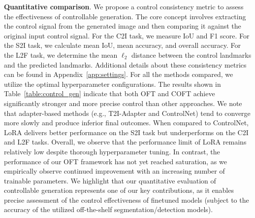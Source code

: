 \textbf{Quantitative comparison}. We propose a control consistency metric to assess the effectiveness of controllable generation. The core concept involves extracting the control signal from the generated image and then comparing it against the original input control signal. For the C2I task, we measure IoU and F1 score. For the S2I task, we calculate mean IoU, mean accuracy, and overall accuracy. For the L2F task, we determine the mean $\ell_2$ distance between the control landmarks and the predicted landmarks. Additional details about these consistency metrics can be found in Appendix~\ref{app:settings}. For all the methods compared, we utilize the optimal hyperparameter configurations. The results shown in Table~\ref{table:control_gen} indicate that both OFT and COFT achieve significantly stronger and more precise control than other approaches. We note that adapter-based methods (e.g., T2I-Adapter and ControlNet) tend to converge more slowly and produce inferior final outcomes. When compared to ControlNet, LoRA delivers better performance on the S2I task but underperforms on the C2I and L2F tasks. Overall, we observe that the performance limit of LoRA remains relatively low despite thorough hyperparameter tuning. In contrast, the performance of our OFT framework has not yet reached saturation, as we empirically observe continued improvement with an increasing number of trainable parameters. We highlight that our quantitative evaluation of controllable generation represents one of our key contributions, as it enables precise assessment of the control effectiveness of finetuned models (subject to the accuracy of the utilized off-the-shelf segmentation/detection models).

